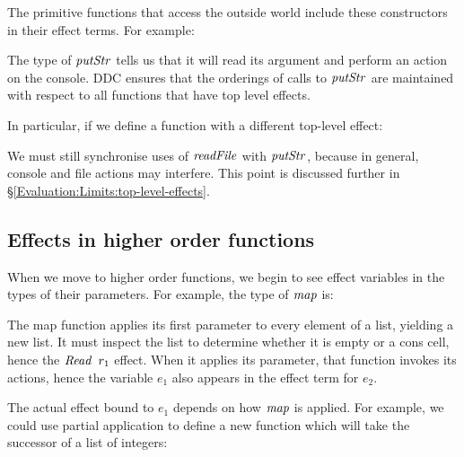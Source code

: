 The primitive functions that access the outside world include these constructors in their effect terms. For example:



The type of $\operatorname{\mathit{putStr}}$ tells us that it will read its argument and perform an action on the console. DDC ensures that the orderings of calls to $\operatorname{\mathit{putStr}}$ are maintained with respect to all functions that have top level effects.

In particular, if we define a function with a different top-level effect:


We must still synchronise uses of $\operatorname{\mathit{readFile}}$ with $\operatorname{\mathit{putStr}}$, because in general, console and file actions may interfere. This point is discussed further in \S\ref{Evaluation:Limits:top-level-effects}.


\clearpage{}
\subsection{Effects in higher order functions}
When we move to higher order functions, we begin to see effect variables in the types of their parameters. For example, the type of $\operatorname{\mathit{map}}$ is:




The map function applies its first parameter to every element of a list, yielding a new list. It must inspect the list to determine whether it is empty or a cons cell, hence the $\operatorname{\mathit{Read}} \ r_1$ effect.  When it applies its parameter, that function invokes its actions, hence the variable $e_1$ also appears in the effect term for $e_2$.

The actual effect bound to $e_1$ depends on how $\operatorname{\mathit{map}}$ is applied. For example, we could use partial application to define a new function which will take the successor of a list of integers:


